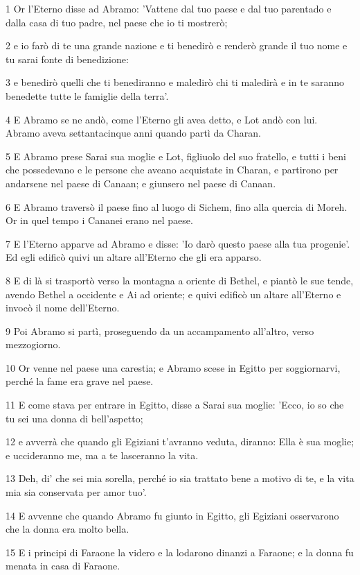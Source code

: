 \par 1 Or l'Eterno disse ad Abramo: 'Vattene dal tuo paese e dal tuo parentado e dalla casa di tuo padre, nel paese che io ti mostrerò;
\par 2 e io farò di te una grande nazione e ti benedirò e renderò grande il tuo nome e tu sarai fonte di benedizione:
\par 3 e benedirò quelli che ti benediranno e maledirò chi ti maledirà e in te saranno benedette tutte le famiglie della terra'.
\par 4 E Abramo se ne andò, come l'Eterno gli avea detto, e Lot andò con lui. Abramo aveva settantacinque anni quando partì da Charan.
\par 5 E Abramo prese Sarai sua moglie e Lot, figliuolo del suo fratello, e tutti i beni che possedevano e le persone che aveano acquistate in Charan, e partirono per andarsene nel paese di Canaan; e giunsero nel paese di Canaan.
\par 6 E Abramo traversò il paese fino al luogo di Sichem, fino alla quercia di Moreh. Or in quel tempo i Cananei erano nel paese.
\par 7 E l'Eterno apparve ad Abramo e disse: 'Io darò questo paese alla tua progenie'. Ed egli edificò quivi un altare all'Eterno che gli era apparso.
\par 8 E di là si trasportò verso la montagna a oriente di Bethel, e piantò le sue tende, avendo Bethel a occidente e Ai ad oriente; e quivi edificò un altare all'Eterno e invocò il nome dell'Eterno.
\par 9 Poi Abramo si partì, proseguendo da un accampamento all'altro, verso mezzogiorno.
\par 10 Or venne nel paese una carestia; e Abramo scese in Egitto per soggiornarvi, perché la fame era grave nel paese.
\par 11 E come stava per entrare in Egitto, disse a Sarai sua moglie: 'Ecco, io so che tu sei una donna di bell'aspetto;
\par 12 e avverrà che quando gli Egiziani t'avranno veduta, diranno: Ella è sua moglie; e uccideranno me, ma a te lasceranno la vita.
\par 13 Deh, di' che sei mia sorella, perché io sia trattato bene a motivo di te, e la vita mia sia conservata per amor tuo'.
\par 14 E avvenne che quando Abramo fu giunto in Egitto, gli Egiziani osservarono che la donna era molto bella.
\par 15 E i principi di Faraone la videro e la lodarono dinanzi a Faraone; e la donna fu menata in casa di Faraone.

